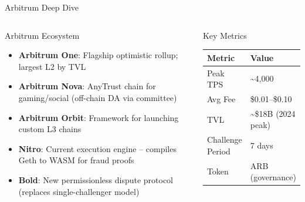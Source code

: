 \documentclass[8pt,aspectratio=169]{beamer}
\begin{document}
\begin{frame}{Arbitrum Deep Dive}
\begin{columns}[T]
\begin{block}{Arbitrum Ecosystem}
\footnotesize
\begin{itemize}
  \item \textbf{Arbitrum One}: Flagship optimistic rollup; largest L2 by TVL
  \item \textbf{Arbitrum Nova}: AnyTrust chain for gaming/social (off-chain DA via committee)
  \item \textbf{Arbitrum Orbit}: Framework for launching custom L3 chains
  \item \textbf{Nitro}: Current execution engine -- compiles Geth to WASM for fraud proofs
  \item \textbf{Bold}: New permissionless dispute protocol (replaces single-challenger model)
\end{itemize}
\end{block}
\vspace{2mm}
\begin{block}{Key Metrics}
\footnotesize
\begin{tabular}{ll}
\toprule
Metric & Value \\
\midrule
Peak TPS & \textasciitilde4{,}000 \\
Avg Fee & \$0.01--\$0.10 \\
TVL & \textasciitilde\$18B (2024 peak) \\
Challenge Period & 7 days \\
Token & ARB (governance) \\
\bottomrule
\end{tabular}
\end{block}
\vspace{1mm}
\end{columns}
\end{frame}
\end{document}
